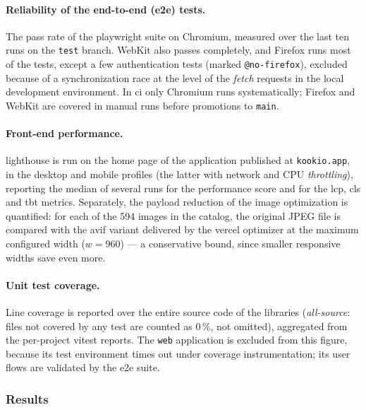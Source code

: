 \paragraph{Reliability of the end-to-end (\acrshort{e2e}) tests.} The pass rate of the \gls{playwright} suite on Chromium, measured over the last ten runs on the \texttt{test} branch. WebKit also passes completely, and Firefox runs most of the tests, except a few authentication tests (marked \texttt{@no-firefox}), excluded because of a synchronization race at the level of the \textit{fetch} requests in the local development environment. In \acrshort{ci} only Chromium runs systematically; Firefox and WebKit are covered in manual runs before promotions to \texttt{main}.

\paragraph{Front-end performance.} \gls{lighthouse} is run on the home page of the application published at \texttt{kookio.app}, in the desktop and mobile profiles (the latter with network and CPU \textit{throttling}), reporting the median of several runs for the performance score and for the \gls{lcp}, \gls{cls} and \gls{tbt} metrics. Separately, the payload reduction of the image optimization is quantified: for each of the 594 images in the catalog, the original JPEG file is compared with the \gls{avif} variant delivered by the \gls{vercel} optimizer at the maximum configured width (\(w=960\)) --- a conservative bound, since smaller responsive widths save even more.

\paragraph{Unit test coverage.} Line coverage is reported over the entire source code of the libraries (\textit{all-source}: files not covered by any test are counted as \(0\,\%\), not omitted), aggregated from the per-project \gls{vitest} reports. The \texttt{web} application is excluded from this figure, because its test environment times out under coverage instrumentation; its user flows are validated by the \acrshort{e2e} suite.

\subsubsection{Results}\label{subsec:rezultate}

